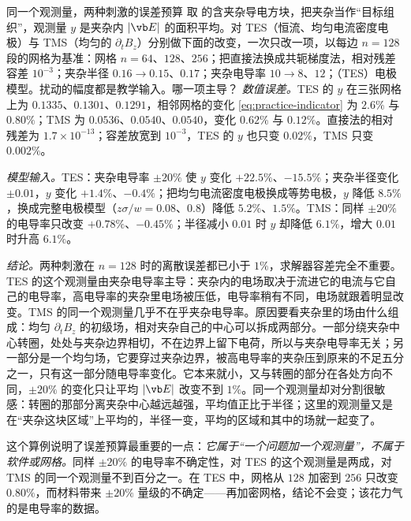 \begin{example}[label=ex:practice-budget]{同一个观测量，两种刺激的误差预算}
取 的含夹杂导电方块，把夹杂当作“目标组织”，观测量 $y$ 是夹杂内 $|\vb E|$ 的面积平均。对 TES（恒流、均匀电流密度电极）与 TMS（均匀的 $\partial_tB_z$）分别做下面的改变，一次只改一项，以每边 $n=128$ 段的网格为基准：网格 $n=64$、$128$、$256$；把直接法换成共轭梯度法，相对残差容差 $10^{-3}$；夹杂半径 $0.16\to0.15$、$0.17$；夹杂电导率 $10\to8$、$12$；（TES）电极模型。扰动的幅度都是教学输入。哪一项主导？
\solution
\emph{数值误差。}TES 的 $y$ 在三张网格上为 $0.1335$、$0.1301$、$0.1291$，相邻网格的变化 \eqref{eq:practice-indicator} 为 $2.6\%$ 与 $0.80\%$；TMS 为 $0.0536$、$0.0540$、$0.0540$，变化 $0.62\%$ 与 $0.12\%$。直接法的相对残差为 $1.7\times10^{-13}$；容差放宽到 $10^{-3}$，TES 的 $y$ 也只变 $0.02\%$，TMS 只变 $0.002\%$。

\emph{模型输入。}TES：夹杂电导率 $\pm20\%$ 使 $y$ 变化 $+22.5\%$、$-15.5\%$；夹杂半径变化 $\pm0.01$，$y$ 变化 $+1.4\%$、$-0.4\%$；把均匀电流密度电极换成等势电极，$y$ 降低 $8.5\%$，换成完整电极模型（$z\sigma/w=0.08$、$0.8$）降低 $5.2\%$、$1.5\%$。TMS：同样 $\pm20\%$ 的电导率只改变 $+0.78\%$、$-0.45\%$；半径减小 $0.01$ 时 $y$ 却降低 $6.1\%$，增大 $0.01$ 时升高 $6.1\%$。

\emph{结论。}两种刺激在 $n=128$ 时的离散误差都已小于 $1\%$，求解器容差完全不重要。TES 的这个观测量由夹杂电导率主导：夹杂内的电场取决于流进它的电流与它自己的电导率，高电导率的夹杂里电场被压低，电导率稍有不同，电场就跟着明显改变。TMS 的同一个观测量几乎不在乎夹杂电导率。原因要看夹杂里的场由什么组成：均匀 $\partial_tB_z$ 的初级场，相对夹杂自己的中心可以拆成两部分。一部分绕夹杂中心转圈，处处与夹杂边界相切，不在边界上留下电荷，所以与夹杂电导率无关；另一部分是一个均匀场，它要穿过夹杂边界，被高电导率的夹杂压到原来的不足五分之一，只有这一部分随电导率变化。它本来就小，又与转圈的部分在各处方向不同，$\pm20\%$ 的变化只让平均 $|\vb E|$ 改变不到 $1\%$。同一个观测量却对分割很敏感：转圈的那部分离夹杂中心越远越强，平均值正比于半径；这里的观测量又是在“夹杂这块区域”上平均的，半径一变，平均的区域和其中的场就一起变了。
\end{example}


这个算例说明了误差预算最重要的一点：\emph{它属于“一个问题加一个观测量”，不属于软件或网格。}同样 $\pm20\%$ 的电导率不确定性，对 TES 的这个观测量是两成，对 TMS 的同一个观测量不到百分之一。在 TES 中，网格从 $128$ 加密到 $256$ 只改变 $0.80\%$，而材料带来 $\pm20\%$ 量级的不确定——再加密网格，结论不会变；该花力气的是电导率的数据。

